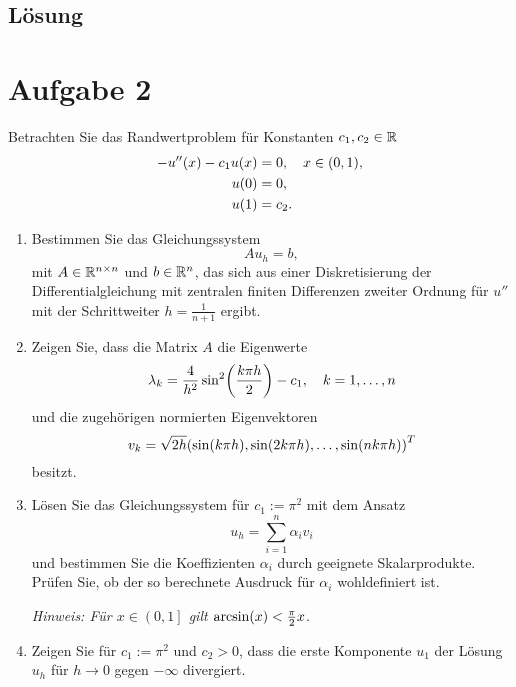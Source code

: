 \documentclass{exercise}
\begin{document}
    \subsection*{Lösung}


    \section*{Aufgabe 2}
    
    \begin{problem}
        Betrachten Sie das Randwertproblem für Konstanten \(c_1, c_2 \in \mathbb{R}\)
        \begin{align*}
            -u''\parentheses*{x} - c_1 u\parentheses*{x} &= 0, \quad x \in \parentheses*{0, 1},\\
            u\parentheses*{0} &= 0,\\
            u\parentheses*{1} &= c_2.
        \end{align*}
        \begin{enumerate}
            \item Bestimmen Sie das Gleichungssystem
            \[
                Au_h = b,
            \]
            mit \(A \in \mathbb{R}^{n \times n}\) und \(b \in \mathbb{R}^n\), das sich aus einer Diskretisierung der Differentialgleichung mit zentralen finiten Differenzen zweiter Ordnung für \(u''\) mit der Schrittweiter \(h = \frac{1}{n + 1}\) ergibt.
            \item Zeigen Sie, dass die Matrix \(A\) die Eigenwerte
            \[
                \lambda_k = \frac{4}{h^2}\sin^2\parentheses*{\frac{k\pi h}{2}} - c_1, \quad k = 1, \ldots, n
            \]
            und die zugehörigen normierten Eigenvektoren
            \[
                v_k = \sqrt{2h}\parentheses*{\sin\parentheses*{k\pi h}, \sin\parentheses*{2k\pi h}, \ldots, \sin\parentheses*{nk\pi h}}^T
            \]
            besitzt.
            \item Lösen Sie das Gleichungssystem für \(c_1 := \pi^2\) mit dem Ansatz
            \[
                u_h = \sum_{i = 1}^n \alpha_i v_i
            \]
            und bestimmen Sie die Koeffizienten \(\alpha_i\) durch geeignete Skalarprodukte.
            Prüfen Sie, ob der so berechnete Ausdruck für \(\alpha_i\) wohldefiniert ist.

            \emph{Hinweis: Für \(x \in \left(0, 1\right]\) gilt \(\arcsin\parentheses*{x} < \frac{\pi}{2}x\).}
            \item Zeigen Sie für \(c_1 := \pi^2\) und \(c_2 > 0\), dass die erste Komponente \(u_1\) der Lösung \(u_h\) für \(h \to 0\) gegen \(-\infty\) divergiert.


\end{enumerate}
\end{problem}
\end{document}

